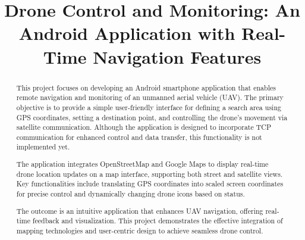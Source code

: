\documentclass[conference]{IEEEtran}
\begin{document}
\title{Drone Control and Monitoring: An Android Application with Real-Time Navigation Features\\}

\author{
\and
{}
\and
{}
}

\maketitle

\begin{abstract}
This project focuses on developing an Android smartphone application that enables remote navigation and monitoring of an unmanned aerial vehicle (UAV). The primary objective is to provide a simple user-friendly interface for defining a search area using GPS coordinates, setting a destination point, and controlling the drone's movement via satellite communication. Although the application is designed to incorporate TCP communication for enhanced control and data transfer, this functionality is not implemented yet.

The application integrates OpenStreetMap and Google Maps to display real-time drone location updates on a map interface, supporting both street and satellite views. Key functionalities include translating GPS coordinates into scaled screen coordinates for precise control and dynamically changing drone icons based on status.

The outcome is an intuitive application that enhances UAV navigation, offering real-time feedback and visualization. This project demonstrates the effective integration of mapping technologies and user-centric design to achieve seamless drone control.
\end{abstract}
\end{document}
